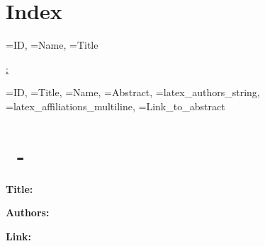 \documentclass[a4paper,12pt]{article}
\begin{document}


\section*{Index}

\begin{itemize}
  {\ID=ID,
  \IndexName=Name,
  \IndexTitle=Title}
  {\item \textbf{\ID} \hyperref[abs:\ID]{\IndexName: \IndexTitle}}
\end{itemize}

\newpage

  {\ID=ID,
  \Title=Title, 
  \Name=Name, 
  \Abstract=Abstract, 
  \Authors=latex_authors_string, 
  \Affiliations=latex_affiliations_multiline,
  \URL=Link_to_abstract}
  {
    \section*{\ID\ - \Name}
    \label{abs:\ID}

    \textbf{Title:} \Title

    \textbf{Authors:} \Authors



    \textbf{Link:} \href{\URL}{\URL}

    \newpage
  }
\end{document}
